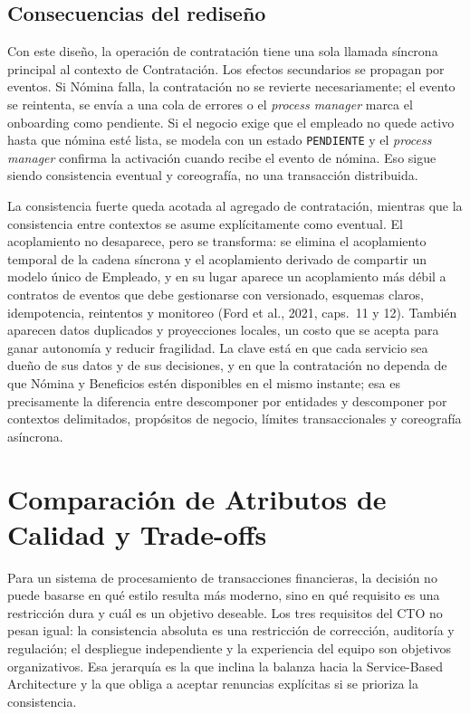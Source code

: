 \documentclass[12pt,a4paper]{article}
\begin{document}
\subsection{Consecuencias del rediseño}

Con este diseño, la operación de contratación tiene una sola llamada síncrona principal al contexto de Contratación. Los efectos secundarios se propagan por eventos. Si Nómina falla, la contratación no se revierte necesariamente; el evento se reintenta, se envía a una cola de errores o el \emph{process manager} marca el onboarding como pendiente. Si el negocio exige que el empleado no quede activo hasta que nómina esté lista, se modela con un estado \texttt{PENDIENTE} y el \emph{process manager} confirma la activación cuando recibe el evento de nómina. Eso sigue siendo consistencia eventual y coreografía, no una transacción distribuida.

La consistencia fuerte queda acotada al agregado de contratación, mientras que la consistencia entre contextos se asume explícitamente como eventual. El acoplamiento no desaparece, pero se transforma: se elimina el acoplamiento temporal de la cadena síncrona y el acoplamiento derivado de compartir un modelo único de Empleado, y en su lugar aparece un acoplamiento más débil a contratos de eventos que debe gestionarse con versionado, esquemas claros, idempotencia, reintentos y monitoreo (Ford et al., 2021, caps.~11 y 12). También aparecen datos duplicados y proyecciones locales, un costo que se acepta para ganar autonomía y reducir fragilidad. La clave está en que cada servicio sea dueño de sus datos y de sus decisiones, y en que la contratación no dependa de que Nómina y Beneficios estén disponibles en el mismo instante; esa es precisamente la diferencia entre descomponer por entidades y descomponer por contextos delimitados, propósitos de negocio, límites transaccionales y coreografía asíncrona.

\section{Comparación de Atributos de Calidad y Trade-offs}

Para un sistema de procesamiento de transacciones financieras, la decisión no puede basarse en qué estilo resulta más moderno, sino en qué requisito es una restricción dura y cuál es un objetivo deseable. Los tres requisitos del CTO no pesan igual: la consistencia absoluta es una restricción de corrección, auditoría y regulación; el despliegue independiente y la experiencia del equipo son objetivos organizativos. Esa jerarquía es la que inclina la balanza hacia la Service-Based Architecture y la que obliga a aceptar renuncias explícitas si se prioriza la consistencia.
\end{document}

